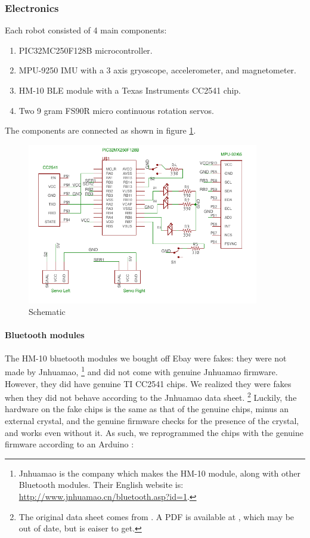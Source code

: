 \documentclass[]{article}
\let\oldparagraph\paragraph
\renewcommand{\paragraph}[1]{\oldparagraph{#1}\mbox{}}
\begin{document}
\hypertarget{electronics}{%
\subsubsection{Electronics}\label{electronics}}

Each robot consisted of 4 main components:
\begin{enumerate}
  \item PIC32MC250F128B microcontroller.
  \item MPU-9250 IMU with a 3 axis gryoscope, accelerometer, and magnetometer.
  \item HM-10 BLE module with a Texas Instruments CC2541 chip.
  \item Two 9 gram FS90R micro continuous rotation servos.
\end{enumerate}

The components are connected as shown in figure \ref{fig:schematic}.

\begin{figure}
  \centering
  \includegraphics[width=0.9\textwidth]{schematic.png}
  \caption{Schematic}
  \label{fig:schematic}
\end{figure}

\paragraph{Bluetooth modules}

The HM-10 bluetooth modules we bought off Ebay were fakes: they were not made by Jnhuamao,
\footnote{Jnhuamao is the company which makes the HM-10 module, along with other Bluetooth modules. Their English website is: \url{http://www.jnhuamao.cn/bluetooth.asp?id=1}.}
and did not come with genuine Jnhuamao firmware.
However, they did have genuine TI CC2541 chips.
We realized they were fakes when they did not behave according to
the Jnhuamao data sheet.
\footnote{The original data sheet comes from \cite{jnhuamaodatasheet}.
A PDF is available at \cite{jnhuamaomit}, which may be out of date, but is eaiser to get.}
Luckily, the hardware on the fake chips is the same as that of the genuine chips, minus an external crystal, and the genuine firmware checks for the presence of the crystal, and works even without
it. \cite{crystal}
As such, we reprogrammed the chips with the genuine firmware according
to an Arduino \cite{crystal}:
\end{document}
